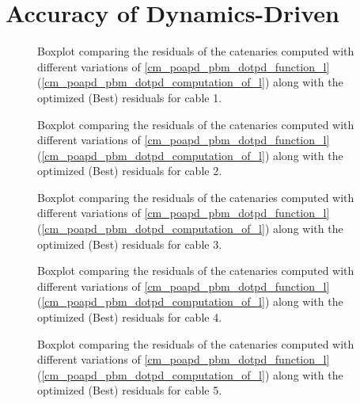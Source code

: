 \section{Accuracy of Dynamics-Driven \augmentedmodeltitle{}}
\label{af_accuracy_of_dynamics_driven_augmented_catenary_model}

\begin{figure}[H]
	\centering
	\caption{
		Boxplot comparing the residuals of the catenaries computed with different variations of
		\cref{cm_poapd_pbm_dotpd_function_l} (\cref{cm_poapd_pbm_dotpd_computation_of_l}) along with the
		optimized (Best) residuals for cable 1.
	}
	\label{af_aoddacm_dynamics_cable_1_boxplot_compare}
\end{figure}
\begin{figure}[H]
	\centering
	\caption{
		Boxplot comparing the residuals of the catenaries computed with different variations of
		\cref{cm_poapd_pbm_dotpd_function_l} (\cref{cm_poapd_pbm_dotpd_computation_of_l}) along with the
		optimized (Best) residuals for cable 2.
	}
	\label{af_aoddacm_dynamics_cable_2_boxplot_compare}
\end{figure}
\begin{figure}[H]
	\centering
	\caption{
		Boxplot comparing the residuals of the catenaries computed with different variations of
		\cref{cm_poapd_pbm_dotpd_function_l} (\cref{cm_poapd_pbm_dotpd_computation_of_l}) along with the
		optimized (Best) residuals for cable 3.
	}
	\label{af_aoddacm_dynamics_cable_3_boxplot_compare}
\end{figure}
\begin{figure}[H]
	\centering
	\caption{
		Boxplot comparing the residuals of the catenaries computed with different variations of
		\cref{cm_poapd_pbm_dotpd_function_l} (\cref{cm_poapd_pbm_dotpd_computation_of_l}) along with the
		optimized (Best) residuals for cable 4.
	}
	\label{af_aoddacm_dynamics_cable_4_boxplot_compare}
\end{figure}
\begin{figure}[H]
	\centering
	\caption{
		Boxplot comparing the residuals of the catenaries computed with different variations of
		\cref{cm_poapd_pbm_dotpd_function_l} (\cref{cm_poapd_pbm_dotpd_computation_of_l}) along with the
		optimized (Best) residuals for cable 5.
	}
	\label{af_aoddacm_dynamics_cable_5_boxplot_compare}
\end{figure}
